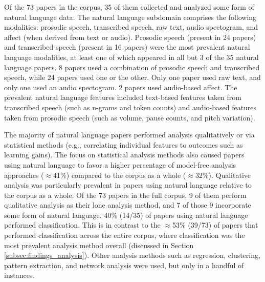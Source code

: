 \documentclass[manuscript,screen,review]{acmart}
\begin{document}
Of the 73 papers in the corpus, 35 of them collected and analyzed some form of natural language data. The natural language subdomain comprises the following modalities: prosodic speech, transcribed speech, raw text, audio spectogram, and affect (when derived from text or audio). Prosodic speech (present in 24 papers) and transcribed speech (present in 16 papers) were the most prevalent natural language modalities, at least one of which appeared in all but 3 of the 35 natural language papers. 8 papers used a combination of prosodic speech and transcribed speech, while 24 papers used one or the other. Only one paper used raw text, and only one used an audio spectogram. 2 papers used audio-based affect. The prevalent natural language features included text-based features taken from transcribed speech (such as n-grams and token counts) and audio-based features taken from prosodic speech (such as volume, pause counts, and pitch variation). 

The majority of natural language papers performed analysis qualitatively or via statistical methods (e.g., correlating individual features to outcomes such as learning gains). The focus on statistical analysis methods also caused papers using natural language to favor a higher percentage of model-free analysis approaches ($\approx$41\%) compared to the corpus as a whole ($\approx$32\%). Qualitative analysis was particularly prevalent in papers using natural language relative to the corpus as a whole. Of the 73 papers in the full corpus, 9 of them perform qualitative analysis as their lone analysis method, and 7 of those 9 incorporate some form of natural language. 40\% (14/35) of papers using natural language performed classification. This is in contrast to the $\approx$53\% (39/73) of papers that performed classification across the entire corpus, where classification was the most prevalent analysis method overall (discussed in Section \ref{subsec:findings_analysis}). Other analysis methods such as regression, clustering, pattern extraction, and network analysis were used, but only in a handful of instances.
\end{document}
